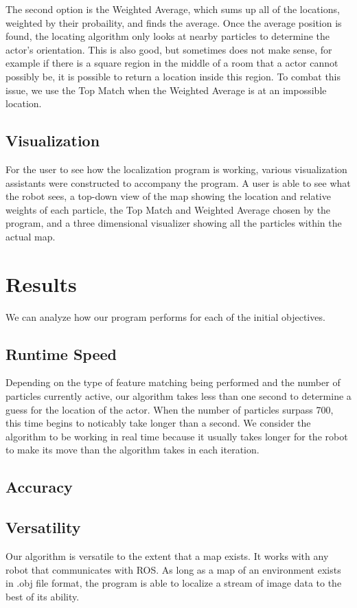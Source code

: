 \documentclass[a4paper,11pt]{article}
\begin{document}
The second option is the Weighted Average, which sums up all of the locations, weighted by their probaility, and finds the average. Once the average position is found, the locating algorithm only looks at nearby particles to determine the actor's orientation. This is also good, but sometimes does not make sense, for example if there is a square region in the middle of a room that a actor cannot possibly be, it is possible to return a location inside this region. To combat this issue, we use the Top Match when the Weighted Average is at an impossible location.

\subsection{Visualization}
For the user to see how the localization program is working, various visualization assistants were constructed to accompany the program. A user is able to see what the robot sees, a top-down view of the map showing the location and relative weights of each particle, the Top Match and Weighted Average chosen by the program, and a three dimensional visualizer showing all the particles within the actual map.

\section{Results}
We can analyze how our program performs for each of the initial objectives.

\subsection{Runtime Speed}
Depending on the type of feature matching being performed and the number of particles currently active, our algorithm takes less than one second to determine a guess for the location of the actor. When the number of particles surpass 700, this time begins to noticably take longer than a second. We consider the algorithm to be working in real time because it usually takes longer for the robot to make its move than the algorithm takes in each iteration.

\subsection{Accuracy}


\subsection{Versatility}
Our algorithm is versatile to the extent that a map exists. It works with any robot that communicates with ROS. As long as a map of an environment exists in .obj file format, the program is able to localize a stream of image data to the best of its ability.
\end{document}
